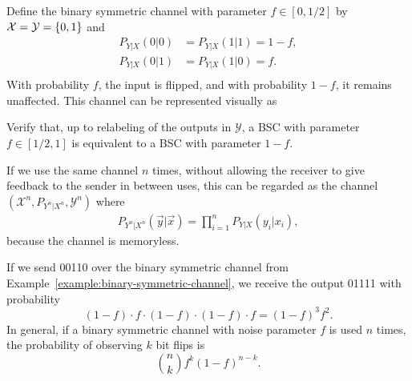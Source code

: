 \begin{example}\label{example:binary-symmetric-channel}
Define the binary symmetric channel with parameter $f \in [0,1/2]$ by $\mathcal{X} = \mathcal{Y} = \{0,1\}$ and
\begin{align*}
P_{Y|X}(0|0) &= P_{Y|X}(1|1) = 1-f,\\
P_{Y|X}(0|1) &= P_{Y|X}(1|0) = f.\\
\end{align*}
With probability $f$, the input is flipped, and with probability $1-f$, it remains unaffected. This channel can be represented visually as
\begin{center}
\end{center} 
\end{example}
\begin{exercise}
Verify that, up to relabeling of the outputs in $\mathcal{Y}$, a BSC with parameter $f \in [1/2,1]$ is equivalent to a BSC with parameter $1-f$.
\end{exercise}
If we use the same channel $n$ times, without allowing the receiver to give feedback to the sender in between uses, this can be regarded as the channel $(\mathcal{X}^n, P_{Y^n|X^n}, \mathcal{Y}^n)$ where
\begin{align}
P_{Y^n|X^n}(\vec{y}|\vec{x}) = \prod_{i=1}^n P_{Y|X}(y_i|x_i),
\end{align}
because the channel is memoryless.

\begin{example}
If we send 00110 over the binary symmetric channel from Example~\ref{example:binary-symmetric-channel}, we receive the output 01111 with probability
\[
(1-f) \cdot f \cdot (1-f) \cdot (1-f) \cdot f = (1-f)^3f^2.
\]
In general, if a binary symmetric channel with noise parameter $f$ is used $n$ times, the probability of observing $k$ bit flips is
\[
{n \choose k} f^{k} (1-f)^{n-k}.
\]
\end{example}

